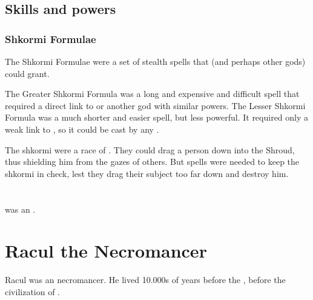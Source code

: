 \subsection{Skills and powers}





\subsubsection{Shkormi Formulae}
The Shkormi Formulae were a set of stealth spells that \Nasshikerr (and perhaps other gods) could grant. 

The Greater Shkormi Formula was a long and expensive and difficult spell that required a direct link to \Nasshikerr or another god with similar powers.
The Lesser Shkormi Formula was a much shorter and easier spell, but less powerful. 
It required only a weak link to \Nasshikerr, so it could be cast by any \rethyax.

The shkormi were a race of \daemons.
They could drag a person down into the Shroud, thus shielding him from the gazes of others. 
But spells were needed to keep the shkormi in check, lest they drag their subject too far down and destroy him. 















\section{\NathRamos}
\index{\NathRamos}
\NathRamos was an \ophidian.















\section{Racul the Necromancer}
Racul was an \ophidian necromancer. 
He lived 10.000s of years before the , before the civilization of .









